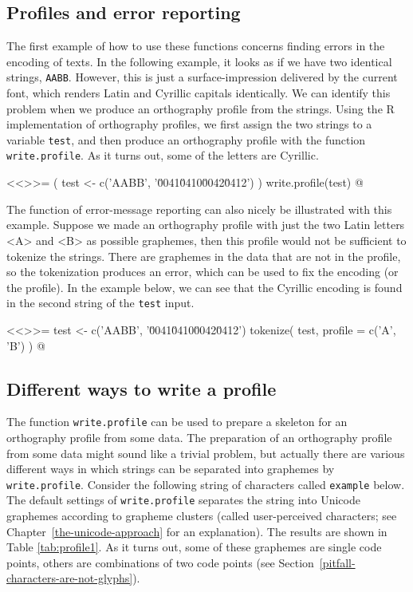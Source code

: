 \subsection*{Profiles and error reporting}
\label{error-reporting}

The first example of how to use these functions concerns finding errors in the
encoding of texts. In the following example, it looks as if we have two
identical strings, \texttt{AABB}. However, this is just a surface-impression
delivered by the current font, which renders Latin and Cyrillic capitals
identically. We can identify this problem when we produce an orthography profile
from the strings. Using the R implementation of orthography profiles, we
first assign the two strings to a variable \texttt{test}, and then produce an
orthography profile with the function \texttt{write.profile}. As it turns out,
some of the letters are Cyrillic.

<<>>=
( test <- c('AABB', '\u0041\u0410\u0042\u0412') )
write.profile(test)
@

The function of error-message reporting can also nicely be illustrated
with this example. Suppose we made an orthography profile with just the two
Latin letters <A> and <B> as possible graphemes, then this profile would not be
sufficient to tokenize the strings. There are graphemes in the data that are not
in the profile, so the tokenization produces an error, which can be used to fix
the encoding (or the profile). In the example below, we can see that the
Cyrillic encoding is found in the second string of the \texttt{test} input.

<<>>=
test <- c('AABB', '\u0041\u0410\u0042\u0412')
tokenize( test, profile = c('A', 'B') )
@

\subsection*{Different ways to write a profile}
\label{write-profile}

The function \texttt{write.profile} can be used to prepare a skeleton for an
orthography profile from some data. The preparation of an orthography profile
from some data might sound like a trivial problem, but actually there are
various different ways in which strings can be separated into graphemes by
\texttt{write.profile}. Consider the following string of characters called
\texttt{example} below. The default settings of \texttt{write.profile} separates
the string into Unicode graphemes according to grapheme clusters (called user-perceived characters; see Chapter~\ref{the-unicode-approach} for an explanation). The results are shown 
in Table \ref {tab:profile1}. As it 
turns out, some of these graphemes are single code points, others are combinations
of two code points (see Section~\ref{pitfall-characters-are-not-glyphs}).


